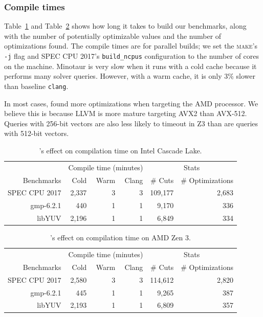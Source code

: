\subsubsection{Compile times}
%
Table~\ref{tab:compiletimeintel} and Table~\ref{tab:compiletimeamd}
shows how long it takes \minotaur{} to build our benchmarks, along
with the number of potentially optimizable values and the number of
optimizations found.
%
The compile times are for parallel builds; we set the \textsc{make}'s
\texttt{-j} flag and SPEC CPU 2017's \texttt{build\_ncpus}
configuration to the number of cores on the machine.
%
Minotaur is very slow when it runs with a cold cache because it
performs many solver queries.
%
However, with a warm cache, it is only 3\% slower than baseline \texttt{clang}.


In most cases, \minotaur{} found more optimizations when targeting the AMD
processor.
%
We believe this is because LLVM is more mature targeting
AVX2 than AVX-512.
%
Queries with 256-bit vectors are also less likely to timeout in Z3 than
are queries with 512-bit vectors.



\begin{table}[t]
  \centering
  \caption{\minotaur's effect on compilation time on Intel Cascade Lake.}
  \begin{tabular}{r | r r r | r r }
    & \multicolumn{3}{c|}{Compile time (minutes)} & \multicolumn{2}{c}{Stats} \\
    Benchmarks & Cold & Warm & Clang & \# Cuts & \# Optimizations \\
    \hline
    SPEC CPU 2017 & 2,337 & 3 & 3 & 109,177 & 2,683  \\
    gmp-6.2.1 & 440 &  1 &  1 & 9,170 & 336 \\
    libYUV & 2,196 &  1 &  1 & 6,849 & 334  \\
  \end{tabular}
  \label{tab:compiletimeintel}
\end{table}

\begin{table}[t]
  \centering
  \caption{\minotaur's effect on compilation time on AMD Zen 3.}
  \begin{tabular}{r | r r r | r r}

    & \multicolumn{3}{c|}{Compile time (minutes)} & \multicolumn{2}{c}{Stats} \\
    Benchmarks & Cold & Warm & Clang & \# Cuts & \# Optimizations \\
    \hline
    SPEC CPU 2017 & 2,580 & 3 & 3 & 114,612 & 2,820 \\
    gmp-6.2.1 &  445 & 1 & 1 & 9,265 & 387\\
    libYUV  & 2,193 & 1 & 1 & 6,809 & 357 \\

  \end{tabular}
  \label{tab:compiletimeamd}
\end{table}


